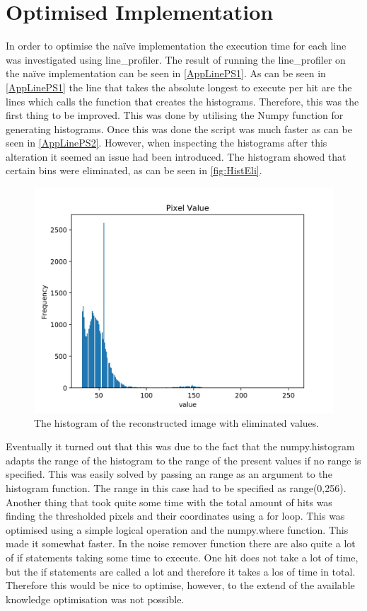 \section{Optimised Implementation}
In order to optimise the na\"ive implementation the execution time for each line was investigated using line_profiler. The result of running the line_profiler on the na\"ive implementation can be seen in \autoref{AppLinePS1}. As can be seen in \autoref{AppLinePS1} the line that takes the absolute longest to execute per hit are the lines which calls the function that creates the histograms. Therefore, this was the first thing to be improved. This was done by utilising the Numpy function for generating histograms. Once this was done the script was much faster as can be seen in \autoref{AppLinePS2}. However, when inspecting the histograms after this alteration it seemed an issue had been introduced. The histogram showed that certain bins were eliminated, as can be seen in \autoref{fig:HistEli}. 
\begin{figure}[h]
\centering
\includegraphics[width=\textwidth]{figures/hist_troublespacing.jpg}
\caption{The histogram of the reconstructed image with eliminated values.}
\label{fig:HistEli}
\end{figure}
\noindent
Eventually it turned out that this was due to the fact that the numpy.histogram adapts the range of the histogram to the range of the present values if no range is specified. This was easily solved by passing an range as an argument to the histogram function. The range in this case had to be specified as range(0,256). 
Another thing that took quite some time with the total amount of hits was finding the thresholded pixels and their coordinates using a for loop. This was optimised using a simple logical operation and the numpy.where function. This made it somewhat faster. In the noise remover function there are also quite a lot of if statements taking some time to execute. One hit does not take a lot of time, but the if statements are called a lot and therefore it takes a los of time in total. Therefore this would be nice to optimise, however, to the extend of the available knowledge optimisation was not possible. \\\\
